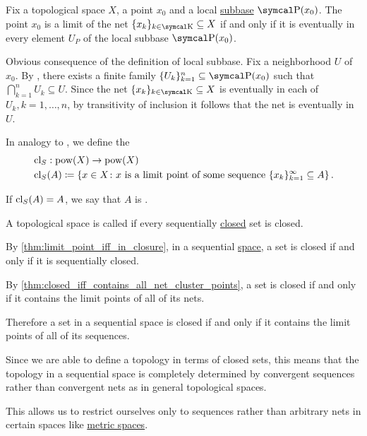\begin{Proposition}\label{thm:net_convergence_via_subbases}
  Fix a topological space \( X \), a point \( x_0 \) and a local \hyperref[def:topological_local_subbase]{subbase} \( \CP(x_0) \). The point \( x_0 \) is a limit of the net \( \{ x_k \}_{k \in \CK} \subseteq X \) if and only if it is eventually in every element \( U_P \) of the local subbase \( \CP(x_0) \).
\end{Proposition}
\begin{RefListProof}
    \ISufficiency Obvious consequence of the definition of local subbase.
    \INecessity Fix a neighborhood \( U \) of \( x_0 \). By , there exists a finite family \( \{ U_k \}_{k=1}^n \subseteq \CP(x_0) \) such that \( \bigcap_{k=1}^n U_k \subseteq U \). Since the net \( \{ x_k \}_{k \in \CK} \subseteq X \) is eventually in each of \( U_k, k = 1, \ldots, n \), by transitivity of inclusion it follows that the net is eventually in \( U \).
\end{RefListProof}

\begin{Definition}\label{def:sequential_closure_operator}
  In analogy to , we define the 
  \begin{align*}
    &\operatorname{cl}_S: \operatorname{pow}(X) \to \operatorname{pow}(X) \\
    &\operatorname{cl}_S(A) \coloneqq \left\{ x \in X \colon x \text{ is a limit point of some sequence } \{ x_k \}_{k=1}^\infty \subseteq A \right\}.
  \end{align*}

  If \( \operatorname{cl}_S(A) = A \), we say that \( A \) is .
\end{Definition}

\begin{Definition}\label{def:sequential_space}
  A topological space is called  if every sequentially \hyperref[def:sequential_closure_operator]{closed} set is closed.
\end{Definition}

\begin{Remark}\label{remark:sequential_spaces}
  By \cref{thm:limit_point_iff_in_closure}, in a sequential \hyperref[def:sequential_space]{space}, a set is closed if and only if it is sequentially closed.

  By \cref{thm:closed_iff_contains_all_net_cluster_points}, a set is closed if and only if it contains the limit points of all of its nets.

  Therefore a set in a sequential space is closed if and only if it contains the limit points of all of its sequences.

  Since we are able to define a topology in terms of closed sets, this means that the topology in a sequential space is completely determined by convergent sequences rather than convergent nets as in general topological spaces.

  This allows us to restrict ourselves only to sequences rather than arbitrary nets in certain spaces like \hyperref[def:metric_space]{metric spaces}.
\end{Remark}

